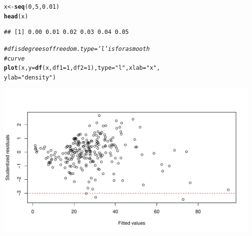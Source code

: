 \documentclass[oneside]{book}\usepackage[]{graphicx}\usepackage[dvipsnames,table,xcdraw]{xcolor}
\makeatletter
\def\maxwidth{ %
  \ifdim\Gin@nat@width>\linewidth
    \linewidth
  \else
    \Gin@nat@width
  \fi
}
\newcommand{\hlnum}[1]{\textcolor[rgb]{0.686,0.059,0.569}{#1}}%
\newcommand{\hlstr}[1]{\textcolor[rgb]{0.192,0.494,0.8}{#1}}%
\newcommand{\hlcom}[1]{\textcolor[rgb]{0.678,0.584,0.686}{\textit{#1}}}%
\newcommand{\hlstd}[1]{\textcolor[rgb]{0.345,0.345,0.345}{#1}}%
\newcommand{\hlkwb}[1]{\textcolor[rgb]{0.69,0.353,0.396}{#1}}%
\newcommand{\hlkwc}[1]{\textcolor[rgb]{0.333,0.667,0.333}{#1}}%
\newcommand{\hlkwd}[1]{\textcolor[rgb]{0.737,0.353,0.396}{\textbf{#1}}}%
\newenvironment{kframe}{%
 \def\at@end@of@kframe{}%
 \ifinner\ifhmode%
  \def\at@end@of@kframe{\end{minipage}}%
  \begin{minipage}{\columnwidth}%
 \fi\fi%
 \def\FrameCommand##1{\hskip\@totalleftmargin \hskip-\fboxsep
 \colorbox{shadecolor}{##1}\hskip-\fboxsep
     \hskip-\linewidth \hskip-\@totalleftmargin \hskip\columnwidth}%
 \MakeFramed {\advance\hsize-\width
   \@totalleftmargin\z@ \linewidth\hsize
   \@setminipage}}%
 {\par\unskip\endMakeFramed%
 \at@end@of@kframe}
\newenvironment{knitrout}{}{} %
\makeatother
\begin{document}
\begin{knitrout}
\color{fgcolor}\begin{kframe}
\begin{alltt}
\hlstd{x} \hlkwb{<-} \hlkwd{seq}\hlstd{(}\hlnum{0}\hlstd{,} \hlnum{5}\hlstd{,} \hlnum{0.01}\hlstd{)}
\hlkwd{head}\hlstd{(x)}
\end{alltt}
\begin{verbatim}
## [1] 0.00 0.01 0.02 0.03 0.04 0.05
\end{verbatim}
\begin{alltt}
\hlcom{# df is degrees of freedom.  type = 'l' is for a smooth}
\hlcom{# curve}
\hlkwd{plot}\hlstd{(x,} \hlkwc{y} \hlstd{=} \hlkwd{df}\hlstd{(x,} \hlkwc{df1} \hlstd{=} \hlnum{1}\hlstd{,} \hlkwc{df2} \hlstd{=} \hlnum{1}\hlstd{),} \hlkwc{type} \hlstd{=} \hlstr{"l"}\hlstd{,} \hlkwc{xlab} \hlstd{=} \hlstr{"x"}\hlstd{,}
  \hlkwc{ylab} \hlstd{=} \hlstr{"density"}\hlstd{)}
\end{alltt}
\end{kframe}

{\centering \includegraphics[width=\maxwidth]{figure/unnamed-chunk-58-1} 

}



\end{knitrout}
\end{document}
